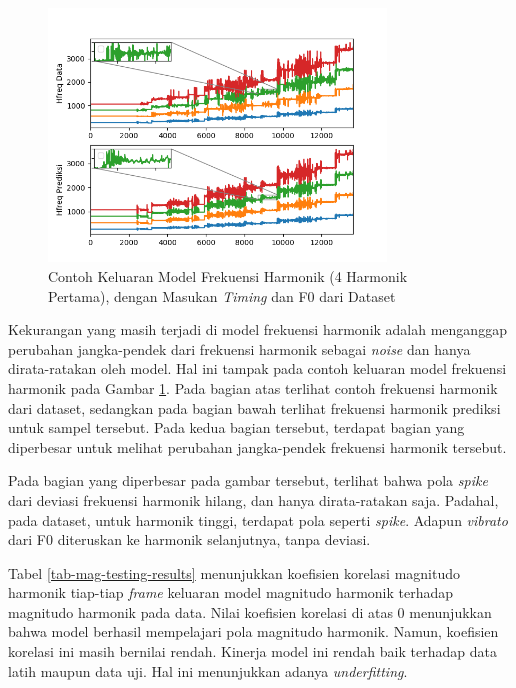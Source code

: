 \begin{figure}[h]
    \centering
    \includegraphics[width=0.8\textwidth]{resources/Analisis_Hfreq.png}
    \caption{Contoh Keluaran Model Frekuensi Harmonik (4 Harmonik Pertama), dengan Masukan \textit{Timing} dan F0 dari Dataset}\label{fig-hfreq-output-sample}
\end{figure}

Kekurangan yang masih terjadi di model frekuensi harmonik adalah menganggap perubahan jangka-pendek dari frekuensi harmonik sebagai \textit{noise} dan hanya dirata-ratakan oleh model. Hal ini tampak pada contoh keluaran model frekuensi harmonik pada Gambar \ref{fig-hfreq-output-sample}. Pada bagian atas terlihat contoh frekuensi harmonik dari dataset, sedangkan pada bagian bawah terlihat frekuensi harmonik prediksi untuk sampel tersebut. Pada kedua bagian tersebut, terdapat bagian yang diperbesar untuk melihat perubahan jangka-pendek frekuensi harmonik tersebut. 

Pada bagian yang diperbesar pada gambar tersebut, terlihat bahwa pola \textit{spike} dari deviasi frekuensi harmonik hilang, dan hanya dirata-ratakan saja. Padahal, pada dataset, untuk harmonik tinggi, terdapat pola seperti \textit{spike}. Adapun \textit{vibrato} dari F0 diteruskan ke harmonik selanjutnya, tanpa deviasi.

Tabel \ref{tab-mag-testing-results} menunjukkan koefisien korelasi magnitudo harmonik tiap-tiap \textit{frame} keluaran model magnitudo harmonik terhadap magnitudo harmonik pada data. Nilai koefisien korelasi di atas 0 menunjukkan bahwa model berhasil mempelajari pola magnitudo harmonik. Namun, koefisien korelasi ini masih bernilai rendah. Kinerja model ini rendah baik terhadap data latih maupun data uji. Hal ini menunjukkan adanya \textit{underfitting}.

